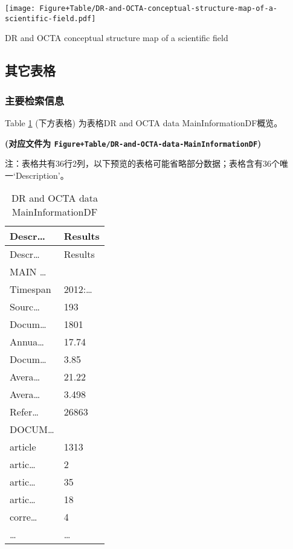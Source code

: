 \documentclass[
]{article}
\begin{document}
\def\@captype{figure}
\begin{center}
\texttt{[image: Figure+Table/DR-and-OCTA-conceptual-structure-map-of-a-scientific-field.pdf]}
\caption{DR and OCTA conceptual structure map of a scientific field}\label{fig:DR-and-OCTA-conceptual-structure-map-of-a-scientific-field}
\end{center}

\hypertarget{extra}{%
\subsection{其它表格}\label{extra}}

\hypertarget{ux4e3bux8981ux68c0ux7d22ux4fe1ux606f}{%
\subsubsection{主要检索信息}\label{ux4e3bux8981ux68c0ux7d22ux4fe1ux606f}}

Table \ref{tab:DR-and-OCTA-data-MainInformationDF} (下方表格) 为表格DR and OCTA data MainInformationDF概览。

\textbf{(对应文件为 \texttt{Figure+Table/DR-and-OCTA-data-MainInformationDF})}

\begin{center}\begin{tcolorbox}[colback=gray!10, colframe=gray!50, width=0.9\linewidth, arc=1mm, boxrule=0.5pt]注：表格共有36行2列，以下预览的表格可能省略部分数据；表格含有36个唯一`Description'。
\end{tcolorbox}
\end{center}

\begin{longtable}[]{@{}ll@{}}
\caption{\label{tab:DR-and-OCTA-data-MainInformationDF}DR and OCTA data MainInformationDF}\tabularnewline
\toprule
Descr\ldots{} & Results\tabularnewline
\midrule
\endfirsthead
\toprule
Descr\ldots{} & Results\tabularnewline
\midrule
\endhead
MAIN \ldots{} &\tabularnewline
Timespan & 2012:\ldots{}\tabularnewline
Sourc\ldots{} & 193\tabularnewline
Docum\ldots{} & 1801\tabularnewline
Annua\ldots{} & 17.74\tabularnewline
Docum\ldots{} & 3.85\tabularnewline
Avera\ldots{} & 21.22\tabularnewline
Avera\ldots{} & 3.498\tabularnewline
Refer\ldots{} & 26863\tabularnewline
DOCUM\ldots{} &\tabularnewline
article & 1313\tabularnewline
artic\ldots{} & 2\tabularnewline
artic\ldots{} & 35\tabularnewline
artic\ldots{} & 18\tabularnewline
corre\ldots{} & 4\tabularnewline
\ldots{} & \ldots{}\tabularnewline
\bottomrule
\end{longtable}
\end{document}

